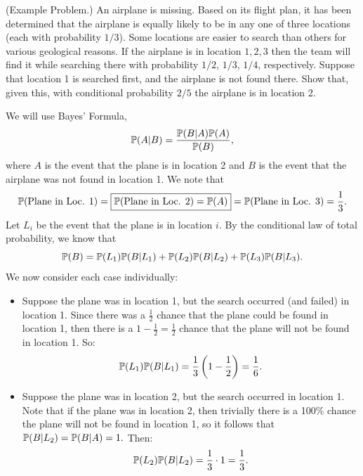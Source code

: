 \begin{mdframed}[]
    (Example Problem.) An airplane is missing. Based on its flight plan, it has been determined that the airplane is equally likely to be in any one of three locations (each with probability $1/3$). Some locations are easier to search than others for various geological reasons. If the airplane is in location $1,2,3$ then the team will find it while searching there with probability $1/2$, $1/3$, $1/4$, respectively. Suppose that location 1 is searched first, and the airplane is not found there. Show that, given this, with conditional probability $2/5$ the airplane is in location 2.

    \begin{mdframed}[]
        We will use Bayes' Formula,
        \[\mathbb{P}(A | B) = \frac{\mathbb{P}(B | A) \mathbb{P}(A)}{\mathbb{P}(B)},\]
        where $A$ is the event that the plane is in location 2 and $B$ is the event that the airplane was not found in location 1. We note that 
        \[\mathbb{P}(\text{Plane in Loc. 1}) = \boxed{\mathbb{P}(\text{Plane in Loc. 2}) = \mathbb{P}(A)} = \mathbb{P}(\text{Plane in Loc. 3}) = \frac{1}{3}.\]
        Let $L_i$ be the event that the plane is in location $i$. By the conditional law of total probability, we know that 
        \[\mathbb{P}(B) = \mathbb{P}(L_1) \mathbb{P}(B|L_1) + \mathbb{P}(L_2) \mathbb{P}(B|L_2) + \mathbb{P}(L_3) \mathbb{P}(B|L_3).\]
        We now consider each case individually:
        \begin{itemize}
            \item Suppose the plane was in location 1, but the search occurred (and failed) in location 1. Since there was a $\frac{1}{2}$ chance that the plane could be found in location 1, then there is a $1 - \frac{1}{2} = \frac{1}{2}$ chance that the plane will not be found in location 1. So:
            \[\mathbb{P}(L_1) \mathbb{P}(B|L_1) = \frac{1}{3} \left(1 - \frac{1}{2}\right) = \frac{1}{6}.\]

            \item Suppose the plane was in location 2, but the search occurred in location 1. Note that if the plane was in location 2, then trivially there is a 100\% chance the plane will not be found in location 1, so it follows that $\mathbb{P}(B|L_2) = \mathbb{P}(B|A) = 1.$ Then:
            \[\mathbb{P}(L_2) \mathbb{P}(B|L_2) = \frac{1}{3} \cdot 1 = \frac{1}{3}.\]
            

\end{itemize}
\end{mdframed}
\end{mdframed}
